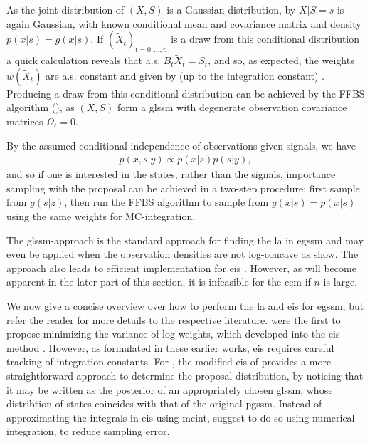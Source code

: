 As the joint distribution of $(X, S)$ is a Gaussian distribution, by  $X|S = s$ is again Gaussian,
with known conditional mean and covariance matrix and density $p(x|s) = g(x|s)$. If $(\tilde X_{t})_{t=0,\dots,n}$ is a draw from this conditional distribution a quick calculation reveals that a.s. $B_{t} \tilde X_{t} = S_{t}$, and so, as expected, the weights $w(\tilde X_{t})$ are a.s. constant and given by (up to the integration constant) . Producing a draw from this conditional distribution can be achieved by the FFBS algorithm (), as $(X, S)$ form a \gls{glssm} with degenerate observation covariance matrices $\Omega_{t} = 0$.

By the assumed conditional independence of observations given signals, we have
\begin{align}
\label{eq:two_step_sample_ssms}
p(x, s|y) \propto p(x|s) p(s|y),
\end{align}
and so if one is interested in the states, rather than the signals, importance sampling with the proposal  can be achieved in a two-step procedure: first sample from $g(s|z)$, then run the FFBS algorithm to sample from $g(x|s) = p(x|s)$ using the same weights for MC-integration. 

The \gls{glssm}-approach is the standard approach for finding the \gls{la} in \gls{egssm} \citep{Durbin1997Monte,Durbin2012Time} and may even be applied when the observation densities are not log-concave as \citep{Jungbacker2007Monte} show. The approach also leads to efficient implementation for \gls{eis} \citep{Koopman2019Modified}. However, as will become apparent in the later part of this section, it is infeasible for the \gls{cem} if $n$ is large. 

We now give a concise overview over how to perform the \gls{la} and \gls{eis} for \gls{egssm}, but refer the reader for more details to the respective literature.
\citep{Danielsson1993Accelerateda} were the first to propose minimizing the variance of log-weights, which developed into the \acrshort{eis} method \citep{Liesenfeld2003Univariate, Richard2007Efficient}. However, as formulated in these earlier works, \acrshort{eis} requires careful tracking of integration constants.  For , the modified \acrshort{eis} of \citep{Koopman2019Modified} provides a more straightforward approach to determine the proposal distribution, by noticing that it may be written as the posterior of an appropriately chosen \acrshort{glssm}, whose distribtion of states coincides with that of the original \acrshort{pgssm}. Instead of approximating the integrals in \acrshort{eis} using \acrshort{mcint}, \citep{Koopman2015Numerically} suggest to do so using numerical integration, to reduce sampling error.

